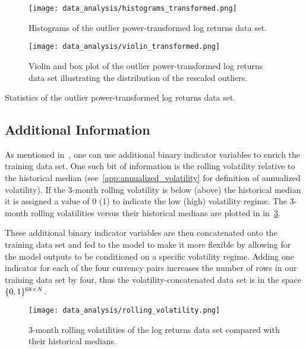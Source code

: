 \begin{figure}[!htb]
    \begin{center}
        \texttt{[image: data\_analysis/histograms\_transformed.png]}
    \end{center}
    \caption{Histograms of the outlier power-transformed log returns data set.}
    \label{fig:histograms_transformed}
\end{figure}
\begin{figure}[!htb]
    \begin{center}
        \texttt{[image: data\_analysis/violin\_transformed.png]}
    \end{center}
    \caption{Violin and box plot of the outlier power-transformed log returns data set illustrating the distribution of the rescaled outliers.}
    \label{fig:violin_transformed}
\end{figure}
\begin{table}[!htb]
    \centering
    \begin{adjustbox}{max width=\textwidth}
        
    \end{adjustbox}
    \caption{Statistics of the outlier power-transformed log returns data set.}
    \label{tbl:data_log_returns_transformed_stats}
\end{table}

\subsection{Additional Information}
As mentioned in~\cite{kondratyev_2019}, one can use additional binary indicator variables to enrich the training data set.
One such bit of information is the rolling volatility relative to the historical median (see~\cref{app:annualized_volatility} for definition of annualized volatility).
If the 3-month rolling volatility is below (above) the historical median it is assigned a value of 0 (1) to indicate the low (high) volatility regime.
The 3-month rolling volatilities versus their historical medians are plotted in in~\cref{fig:rolling_volatility}.

These additional binary indicator variables are then concatenated onto the training data set and fed to the model to make it more flexible by allowing for the model outputs to be conditioned on a specific volatility regime.
Adding one indicator for each of the four currency pairs increases the number of rows in our training data set by four, thus the volatility-concatenated data set is in the space \( \{0,1\}^{68 \times N} \).

\begin{figure}[!htb]
    \begin{center}
        \texttt{[image: data\_analysis/rolling\_volatility.png]}
    \end{center}
    \caption{3-month rolling volatilities of the log returns data set compared with their historical medians.}
    \label{fig:rolling_volatility}
\end{figure}
